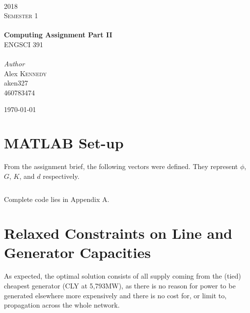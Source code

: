 \documentclass[11pt]{article}
\begin{document}
\begin{titlepage}
	\newcommand{\HRule}{\rule{\linewidth}{0.5mm}} %

	\center


	\textsc{\LARGE }\\[1.5cm]
	\textsc{\Large 2018}\\[0.5cm]
	\textsc{\large Semester 1}\\[1cm]

	{
	}\\[0.4cm]

	{\huge\bfseries Computing Assignment Part II}\\[0.6cm]
	{\large ENGSCI 391}\\[1cm]

	{
	}\\[1cm]

	{\large\textit{Author}}\\
	Alex \textsc{Kennedy\\[1cm]}
	aken327\\
	460783474

	\vfill\vfill\vfill
	{\large\today}
	\vfill

\end{titlepage}

\section{MATLAB Set-up}

From the assignment brief, the following vectors were defined. They represent $\phi$, $G$, $K$, and $d$ respectively. 

\inputminted[firstline=5, lastline=8]{matlab}{main.m}

Complete code lies in Appendix A.

\section{Relaxed Constraints on Line and Generator Capacities}
As expected, the optimal solution consists of all supply coming from the (tied) cheapest generator (CLY at 5,793MW), as there is no reason for power to be generated elsewhere more expensively and there is no cost for, or limit to, propagation across the whole network. 
\end{document}
